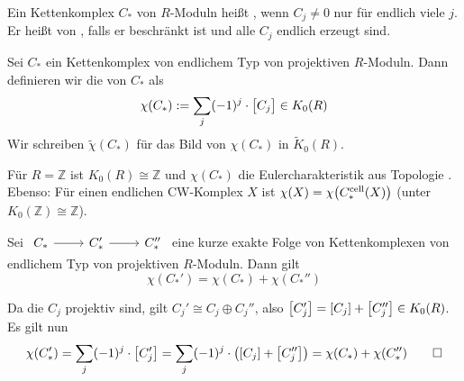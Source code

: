 \begin{definition}
    Ein Kettenkomplex $C_*$ von $R$-Moduln heißt , wenn $C_j \neq 0$ nur für endlich viele $j$.
    Er heißt von , falls er beschränkt ist und alle $C_j$ endlich erzeugt sind.
\end{definition}

\begin{definition}
    Sei $C_*$ ein Kettenkomplex von endlichem Typ von projektiven $R$-Moduln.
    Dann definieren wir die  von $C_*$ als 
    \[
        \chi(C_*) := \sum_j (-1)^j \cdot \benbrace[\big]{C_j} \in K_0(R)
    \]
    Wir schreiben $\tilde{\chi}(C_*)$ für das Bild von $\chi(C_*)$ in $\tilde{K}_0(R)$.
\end{definition}

\begin{bemerkung}
    Für $R=\mathbb{Z}$ ist $K_0(R) \cong \mathbb{Z}$ und $\chi(C_*)$ die Eulercharakteristik aus Topologie .    
    Ebenso: Für einen endlichen CW-Komplex $X$ ist $\chi(X) = \chi \enbrace*{C^{\cell}_*(X)}$ (unter $K_0(\mathbb{Z})\cong \mathbb{Z}$).
\end{bemerkung}

\begin{lemma}
    Sei $\begin{tikzcd} C_* \rar & C_*' \rar & C_*'' \end{tikzcd}$ eine kurze exakte Folge von Kettenkomplexen von endlichem Typ von projektiven $R$-Moduln.
    Dann gilt
    \[
        \chi(C_*') = \chi(C_*) + \chi(C_*'')
    \]
\end{lemma}
\begin{beweis}
    Da die $C_j$ projektiv sind, gilt $C_j' \cong C_j \oplus C_j''$, also $\benbrace*{C_j'} = \benbrace*{C_j} + \benbrace*{C_j''} \in K_0(R)$.
    Es gilt nun
    \[
        \chi(C_*') = \sum_{j} (-1)^j \cdot \benbrace*{C_j'} = \sum_j (-1)^j \cdot \enbrace*{ \benbrace*{C_j} + \benbrace*{C_j''}} = \chi(C_*) + \chi(C_*'') \qedhere
    \]
\end{beweis}

